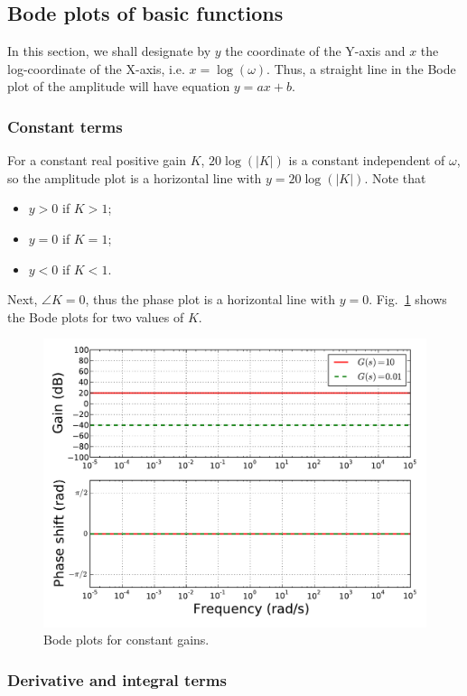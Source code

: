 \documentclass[a4paper,11pt]{report}
\theoremstyle{definition}
\begin{document}
\subsection{Bode plots of basic functions}

In this section, we shall designate by $y$ the coordinate of the
Y-axis and $x$ the log-coordinate of the X-axis,
i.e. $x=\log(\omega)$. Thus, a straight line in the Bode plot of the
amplitude will have equation $y=ax+b$.

\subsubsection{Constant terms}

For a constant real positive gain $K$, $20\log(|K|)$ is a constant
independent of $\omega$, so the amplitude plot is a horizontal line
with $y=20\log(|K|)$. Note that
\begin{itemize}
\item $y>0$ if $K>1$;
\item $y=0$ if $K=1$;
\item $y<0$ if $K<1$.
\end{itemize}

Next, $\angle K=0$, thus the phase plot is a horizontal line with
$y=0$. Fig.~\ref{fig:bode-const} shows the Bode plots for two values
of $K$.

\begin{figure}[H]
  \centering
  \includegraphics[width=12cm]{fig/bode-const.pdf}
  \caption{Bode plots for constant gains.}
  \label{fig:bode-const}
\end{figure}

\subsubsection{Derivative and integral terms}
\end{document}
